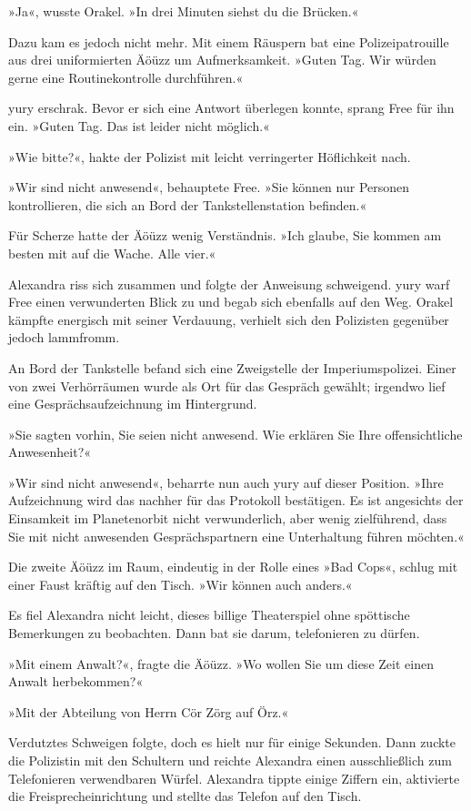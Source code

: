 »Ja«, wusste Orakel. »In drei Minuten siehst du die Brücken.«

Dazu kam es jedoch nicht mehr. Mit einem Räuspern bat eine Polizeipatrouille aus drei uniformierten Äöüzz um Aufmerksamkeit. »Guten Tag. Wir würden gerne eine Routinekontrolle durchführen.«

yury erschrak. Bevor er sich eine Antwort überlegen konnte, sprang Free für ihn ein. »Guten Tag. Das ist leider nicht möglich.«

»Wie bitte?«, hakte der Polizist mit leicht verringerter Höflichkeit nach.

»Wir sind nicht anwesend«, behauptete Free. »Sie können nur Personen kontrollieren, die sich an Bord der Tankstellenstation befinden.«

Für Scherze hatte der Äöüzz wenig Verständnis. »Ich glaube, Sie kommen am besten mit auf die Wache. Alle vier.«

Alexandra riss sich zusammen und folgte der Anweisung schweigend. yury warf Free einen verwunderten Blick zu und begab sich ebenfalls auf den Weg. Orakel kämpfte energisch mit seiner Verdauung, verhielt sich den Polizisten gegenüber jedoch lammfromm.

An Bord der Tankstelle befand sich eine Zweigstelle der Imperiumspolizei. Einer von zwei Verhörräumen wurde als Ort für das Gespräch gewählt; irgendwo lief eine Gesprächsaufzeichnung im Hintergrund.

»Sie sagten vorhin, Sie seien nicht anwesend. Wie erklären Sie Ihre offensichtliche Anwesenheit?«

»Wir sind nicht anwesend«, beharrte nun auch yury auf dieser Position. »Ihre Aufzeichnung wird das nachher für das Protokoll bestätigen. Es ist angesichts der Einsamkeit im Planetenorbit nicht verwunderlich, aber wenig zielführend, dass Sie mit nicht anwesenden Gesprächspartnern eine Unterhaltung führen möchten.«

Die zweite Äöüzz im Raum, eindeutig in der Rolle eines »Bad Cops«, schlug mit einer Faust kräftig auf den Tisch. »Wir können auch anders.«

Es fiel Alexandra nicht leicht, dieses billige Theaterspiel ohne spöttische Bemerkungen zu beobachten. Dann bat sie darum, telefonieren zu dürfen.

»Mit einem Anwalt?«, fragte die Äöüzz. »Wo wollen Sie um diese Zeit einen Anwalt herbekommen?«

»Mit der Abteilung von Herrn Cör Zörg auf Örz.«

Verdutztes Schweigen folgte, doch es hielt nur für einige Sekunden. Dann zuckte die Polizistin mit den Schultern und reichte Alexandra einen ausschließlich zum Telefonieren verwendbaren Würfel. Alexandra tippte einige Ziffern ein, aktivierte die Freisprecheinrichtung und stellte das Telefon auf den Tisch.

